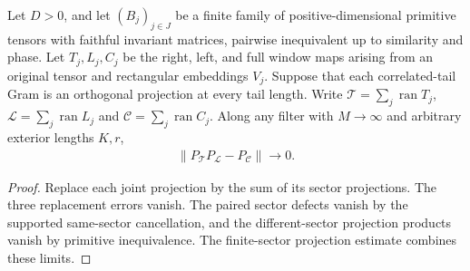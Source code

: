 \begin{lemma}
    \label{thm:residual_window_joint_projection_decay}
    \leanok
    Let $D>0$, and let $(B_j)_{j\in J}$ be a finite family of positive-dimensional
    primitive tensors with faithful invariant matrices, pairwise inequivalent
    up to similarity and phase. Let $T_j,L_j,C_j$ be the right, left, and full
    window maps arising from an original tensor and rectangular embeddings $V_j$.
    Suppose that each correlated-tail Gram is an orthogonal projection at every
    tail length. Write $\mathcal T=\sum_j\operatorname{ran}T_j$,
    $\mathcal L=\sum_j\operatorname{ran}L_j$ and
    $\mathcal C=\sum_j\operatorname{ran}C_j$. Along any filter with $M\to\infty$
    and arbitrary exterior lengths $K,r$,
    \begin{align}
        \|P_{\mathcal T}P_{\mathcal L}-P_{\mathcal C}\|\longrightarrow0.
    \end{align}

\end{lemma}
\begin{proof}\leanok
    Replace each joint projection by the sum of its sector projections.
    The three replacement errors vanish. The paired sector defects vanish
    by the supported same-sector cancellation, and the different-sector
    projection products vanish by primitive inequivalence. The finite-sector
    projection estimate combines these limits.
\end{proof}

